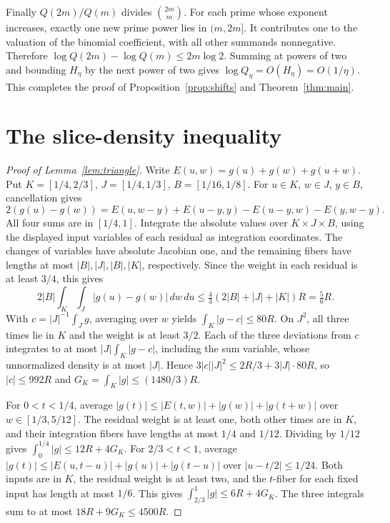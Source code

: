 \documentclass[11pt,reqno]{amsart}
\numberwithin{equation}{section}
\begin{document}
Finally \(Q(2m)/Q(m)\) divides \(\binom{2m}{m}\).
For each prime whose exponent increases, exactly one new prime
power lies in \((m,2m]\). It contributes one to the valuation of
the binomial coefficient, with all other summands nonnegative.
Therefore \(\log Q(2m)-\log Q(m)\le2m\log2\).
Summing at powers of two and bounding \(H_\eta\) by the next
power of two gives \(\log Q_\eta=O(H_\eta)=O(1/\eta)\).
This completes the proof of Proposition~\ref{prop:shifts} and
Theorem~\ref{thm:main}.

\appendix
\section{The slice-density inequality}\label{app:slice-density}

\begin{proof}[Proof of Lemma~\ref{lem:triangle}]
Write \(E(u,w)=g(u)+g(w)+g(u+w)\).
Put \(K=[1/4,2/3]\), \(J=[1/4,1/3]\), \(B=[1/16,1/8]\).
For \(u\in K\), \(w\in J\), \(y\in B\), cancellation gives
\[
 2(g(u)-g(w))=E(u,w-y)+E(u-y,y)-E(u-y,w)-E(y,w-y).
\]
All four sums are in \([1/4,1]\). Integrate the absolute values
over \(K\times J\times B\), using the displayed input variables
of each residual as integration coordinates. The changes of
variables have absolute Jacobian one, and the remaining fibers
have lengths at most \(|B|,|J|,|B|,|K|\), respectively. Since the
weight in each residual is at least \(3/4\), this gives
\[
 2|B|\int_K\int_J |g(u)-g(w)|\,dw\,du
 \le \tfrac43(2|B|+|J|+|K|)R=\tfrac56 R .
\]
With \(c=|J|^{-1}\int_Jg\), averaging over \(w\) yields
\(\int_K|g-c|\le80R\). On \(J^2\), all three times lie in \(K\)
and the weight is at least \(3/2\). Each of the three deviations
from \(c\) integrates to at most \(|J|\int_K|g-c|\), including
the sum variable, whose unnormalized density is at most \(|J|\).
Hence \(3|c||J|^2\le 2R/3+3|J|\cdot80R\),
so \(|c|\le992R\) and \(G_K=\int_K|g|\le (1480/3)R\).

For \(0<t<1/4\), average
\(|g(t)|\le |E(t,w)|+|g(w)|+|g(t+w)|\)
over \(w\in[1/3,5/12]\). The residual weight is at least one,
both other times are in \(K\), and their integration fibers
have lengths at most \(1/4\) and \(1/12\). Dividing by \(1/12\)
gives \(\int_0^{1/4}|g|\le12R+4G_K\).
For \(2/3<t<1\), average
\(|g(t)|\le |E(u,t-u)|+|g(u)|+|g(t-u)|\)
over \(|u-t/2|\le1/24\).
Both inputs are in \(K\), the residual weight is at least two,
and the \(t\)-fiber for each fixed input has length at most \(1/6\).
This gives \(\int_{2/3}^1|g|\le6R+4G_K\).
The three integrals sum to at most \(18R+9G_K\le4500R\).
\end{proof}
\end{document}
